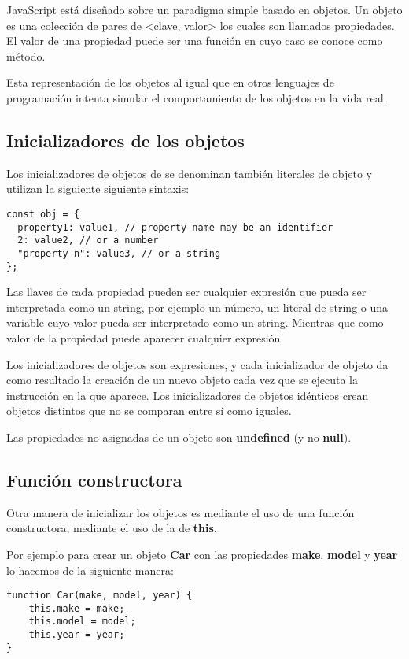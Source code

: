 \documentclass{article}
\begin{document}
JavaScript está diseñado sobre un paradigma simple basado en objetos. Un objeto es una colección de pares de
<clave, valor> los cuales son llamados propiedades. El valor de una propiedad puede ser una función en cuyo caso
se conoce como método.

Esta representación de los objetos al igual que en otros lenguajes de programación intenta simular el comportamiento
de los objetos en la vida real.

\subsection{Inicializadores de los objetos}

Los inicializadores de objetos de se denominan también literales de objeto y utilizan la siguiente siguiente sintaxis:

\begin{lstlisting}
const obj = {
  property1: value1, // property name may be an identifier
  2: value2, // or a number
  "property n": value3, // or a string
};
\end{lstlisting}

Las llaves de cada propiedad pueden ser cualquier expresión que pueda ser interpretada como un string,
por ejemplo un número, un literal de string o una variable cuyo valor pueda ser interpretado como un string.
Mientras que como valor de la propiedad puede aparecer cualquier expresión.

Los inicializadores de objetos son expresiones, y cada inicializador de
objeto da como resultado la creación de un nuevo objeto cada vez que se
ejecuta la instrucción en la que aparece. Los inicializadores de objetos idénticos crean objetos distintos que no se comparan entre sí como iguales.

Las propiedades no asignadas de un objeto son \textbf{undefined} (y no \textbf{null}).

\subsection{Función constructora}

Otra manera de inicializar los objetos es mediante el uso de una función constructora, mediante el uso de la
de \textbf{this}.

Por ejemplo para crear un objeto \textbf{Car} con las propiedades \textbf{make}, \textbf{model} y \textbf{year}
lo hacemos de la siguiente manera:

\begin{lstlisting}
function Car(make, model, year) {
    this.make = make;
    this.model = model;
    this.year = year;
}
\end{lstlisting}
\end{document}
